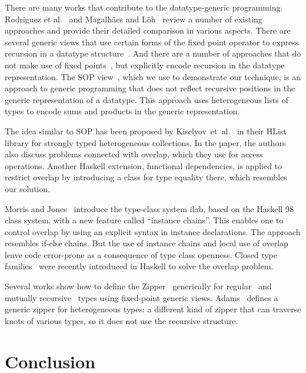 \documentclass[runningheads]{llncs}
\begin{document}
There are many works that contribute to the datatype-generic programming. Rodriguez et al.~\cite{Rodriguez2008} and Magalh{\~{a}}es and L{\"{o}}h~\cite{MagLoeh2012} review a number of existing approaches and provide their detailed comparison in various aspects. There are several generic views that use certain forms of the fixed point operator to express recursion in a datatype structure~\cite{VanNoort2008,MuRec2009,Jansson1997,Loeh2011}. And there are a number of approaches that do not make use of fixed points~\cite{Chakravarty2009,Magalhaes2010}, but explicitly encode recursion in the datatype representation. The SOP view~\cite{VriLoeh2014}, which we use to demonstrate our technique, is an approach to generic programming that does not reflect recursive positions in the generic representation of a datatype. This approach uses heterogeneous lists of types to encode sums and products in the generic representation.

The idea similar to SOP has been proposed by Kiselyov~et~al.~\cite{Kiselyov2004} in their \textsf{HList} library for strongly typed heterogeneous collections. In the paper, the authors also discuss problems connected with overlap, which they use for access operations. Another Haskell extension, functional dependencies, is applied to restrict overlap by introducing a class for type equality there, which resembles our solution.

Morris and Jones~\cite{Morris2010} introduce the type-class system \textsf{ilab}, based on the Haskell 98 class system, with a new feature called ``instance chains''. This enables one to control overlap by using an explicit syntax in instance declarations. The approach resembles if-else chains. But the use of instance chains and local use of overlap leave code error-prone as a consequence of type class openness. Closed type families~\cite{Eisenberg2014} were recently introduced in Haskell to solve the overlap problem.

Several works show how to define the Zipper~\cite{Huet1997} generically for regular~\cite{HiJeLo2004,McBride2001} and mutually recursive~\cite{MuRec2009} types using fixed-point generic views. Adams~\cite{Adams2010} defines a generic zipper for heterogeneous types: a different kind of zipper that can traverse knots of various types, so it does not use the recursive structure.


\section{Conclusion}
\label{sec:conclusion}
\end{document}
